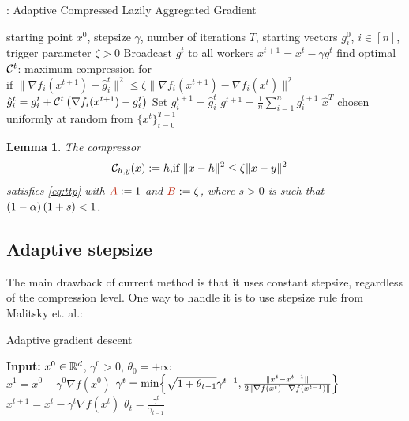 \documentclass[nohyperref]{article}
\theoremstyle{plain}
\newtheorem{lemma}[theorem]{Lemma}
\theoremstyle{definition}
\theoremstyle{remark}
\newcommand{\n}[1]{\|#1 \|}
\begin{document}
\begin{algorithm}[!h]
   \caption*{: Adaptive Compressed Lazily Aggregated Gradient}\label{alg:clag}
\begin{algorithmic}[1]
    starting point $x^0$, stepsize $\gamma$, number of iterations $T$, starting vectors $g_i^0$, $i \in [n]$, trigger parameter $\zeta > 0$
   \STATE Broadcast $g^t$ to all workers
   \STATE $x^{t+1} = x^t - \gamma g^t$
   \STATE find optimal $\mathcal{C}^t$: maximum compression for $\text{if } \|\nabla f_i(x^{t+1}) - \hat{g}_i^t\|^2 \leq \zeta \|\nabla f_i(x^{t+1}) - \nabla f_i(x^t)\|^2$
   \STATE $\hat{g}_i^t = g_i^t + \mathcal{C}^t\left(\nabla f_i(x^{t+1}) - g_i^t\right)$
   \STATE Set $g_i^{t+1} = \hat{g}_i^t$ 
   \ENDFOR
   \STATE $g^{t+1} = \tfrac{1}{n}\sum_{i=1}^ng_i^{t+1}$
   \ENDFOR
    $\hat x^T$ chosen uniformly at random from $\{x^t\}_{t=0}^{T-1}$
\end{algorithmic}
\end{algorithm}

\begin{lemma}\label{lem:clag}
	The compressor
	\begin{eqnarray}
	\mathcal{C}_{h,y}(x) := h,& \text{if } \|x - h\|^2 \leq \zeta \|x - y\|^2\label{eq:clag_compressor}
	\end{eqnarray}
	satisfies \eqref{eq:ttp} with $\thetaNEW \eqdef 1$ and $\betaNEW \eqdef \zeta$, where $s> 0$ is such that  $(1-\alpha)\left(1 + s\right) < 1$.
\end{lemma}

\clearpage

\subsection{Adaptive stepsize}

The main drawback of current method is that it uses constant stepsize, regardless of the compression level. One way to handle it is to use stepsize rule from Malitsky et. al.:

 \begin{algorithm}[!h]
 \caption{Adaptive gradient descent}
 \label{alg:main}
 \begin{algorithmic}[1]
     \STATE \textbf{Input:} $x^0 \in \mathbb R^d$, $\gamma^0>0$,
     $\theta_0=+\infty$\\
     \STATE  $x^1= x^0-\gamma^0\nabla f(x^0)$
        \STATE $\gamma^t = \min\Bigl\{
        \sqrt{1+\theta_{t-1}}\gamma^{t-1},\frac{\n{x^{t}-x^{t-1}}}{2\n{\nabla
        f(x^{t})-\nabla f(x^{t-1})}}\Bigr\}$
\STATE $x^{t+1} = x^t - \gamma^t \nabla f(x^t)$
\STATE $\theta_t = \frac{\gamma^t}{\gamma_{t-1}}$
        \ENDFOR
 \end{algorithmic}
 \end{algorithm}
 
\end{document}
